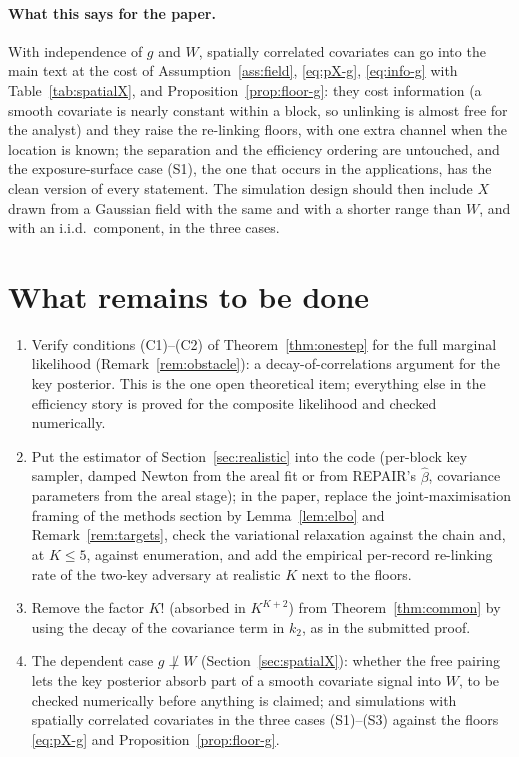 \documentclass[11pt]{article}
\theoremstyle{definition}
\begin{document}
\paragraph{What this says for the paper.} With independence of $g$ and $W$, spatially correlated covariates can go into the main text at the cost of Assumption~\ref{ass:field}, \eqref{eq:pX-g}, \eqref{eq:info-g} with Table~\ref{tab:spatialX}, and Proposition~\ref{prop:floor-g}: they cost information (a smooth covariate is nearly constant within a block, so unlinking is almost free for the analyst) and they raise the re-linking floors, with one extra channel when the location is known; the separation and the efficiency ordering are untouched, and the exposure-surface case (S1), the one that occurs in the applications, has the clean version of every statement. The simulation design should then include $X$ drawn from a Gaussian field with the same and with a shorter range than $W$, and with an i.i.d.\ component, in the three cases.

\section*{What remains to be done}
\begin{enumerate}
\item Verify conditions (C1)--(C2) of Theorem~\ref{thm:onestep} for the full marginal likelihood (Remark~\ref{rem:obstacle}): a decay-of-correlations argument for the key posterior. This is the one open theoretical item; everything else in the efficiency story is proved for the composite likelihood and checked numerically.
\item Put the estimator of Section~\ref{sec:realistic} into the code (per-block key sampler, damped Newton from the areal fit or from REPAIR's $\hat\beta$, covariance parameters from the areal stage); in the paper, replace the joint-maximisation framing of the methods section by Lemma~\ref{lem:elbo} and Remark~\ref{rem:targets}, check the variational relaxation against the chain and, at $K\le5$, against enumeration, and add the empirical per-record re-linking rate of the two-key adversary at realistic $K$ next to the floors.
\item Remove the factor $K!$ (absorbed in $K^{K+2}$) from Theorem~\ref{thm:common} by using the decay of the covariance term in $k_2$, as in the submitted proof.
\item The dependent case $g\not\perp W$ (Section~\ref{sec:spatialX}): whether the free pairing lets the key posterior absorb part of a smooth covariate signal into $W$, to be checked numerically before anything is claimed; and simulations with spatially correlated covariates in the three cases (S1)--(S3) against the floors \eqref{eq:pX-g} and Proposition~\ref{prop:floor-g}.
\end{enumerate}
\end{document}
